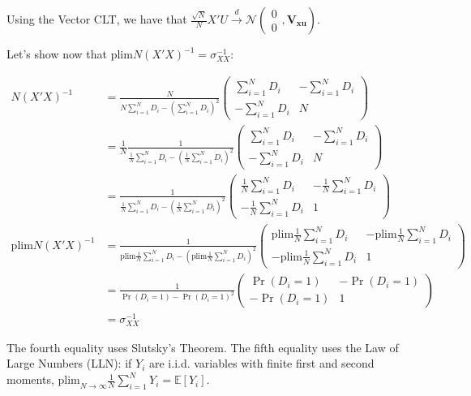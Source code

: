 \documentclass[]{book}
\newcommand{\esp}[1]{\mathbb{E}[ #1 ]}
\newcommand{\plim}[1]{\text{plim}_{ #1 \rightarrow \infty}}
\newcommand{\plims}{\text{plim}}
\theoremstyle{definition}
\theoremstyle{definition}
\theoremstyle{definition}
\theoremstyle{remark}
\begin{document}
Using the Vector CLT, we have that
\(\frac{\sqrt{N}}{N}X'U\stackrel{d}{\rightarrow}\mathcal{N}\left(\begin{array}{c} 0\\ 0\end{array},\mathbf{V_{xu}}\right)\).

Let's show now that \(\plims N(X'X)^{-1}=\sigma_{XX}^{-1}\):

\begin{align*}
N(X'X)^{-1} & = \frac{N}{N\sum_{i=1}^ND_i-\left(\sum_{i=1}^ND_i\right)^2}
                \left(\begin{array}{cc} \sum_{i=1}^ND_i & -\sum_{i=1}^ND_i \\ -\sum_{i=1}^ND_i & N \end{array}\right) \\
            & = \frac{1}{N}\frac{1}{\frac{1}{N}\sum_{i=1}^ND_i-\left(\frac{1}{N}\sum_{i=1}^ND_i\right)^2}
                \left(\begin{array}{cc} \sum_{i=1}^ND_i & -\sum_{i=1}^ND_i \\ -\sum_{i=1}^ND_i & N \end{array}\right)\\
            & = \frac{1}{\frac{1}{N}\sum_{i=1}^ND_i-\left(\frac{1}{N}\sum_{i=1}^ND_i\right)^2}
                \left(\begin{array}{cc} \frac{1}{N}\sum_{i=1}^ND_i & -\frac{1}{N}\sum_{i=1}^ND_i \\ -\frac{1}{N}\sum_{i=1}^ND_i & 1 \end{array}\right)\\
\plims N(X'X)^{-1} & = \frac{1}{\plims\frac{1}{N}\sum_{i=1}^ND_i-\left(\plims\frac{1}{N}\sum_{i=1}^ND_i\right)^2}
                \left(\begin{array}{cc} \plims\frac{1}{N}\sum_{i=1}^ND_i & -\plims\frac{1}{N}\sum_{i=1}^ND_i \\ -\plims\frac{1}{N}\sum_{i=1}^ND_i & 1 \end{array}\right)\\
                  & = \frac{1}{\Pr(D_i=1)-\Pr(D_i=1)^2}
                \left(\begin{array}{cc} \Pr(D_i=1) & -\Pr(D_i=1) \\ -\Pr(D_i=1) & 1 \end{array}\right)\\
                 & = \sigma_{XX}^{-1}
\end{align*}

The fourth equality uses Slutsky's Theorem. The fifth equality uses the
Law of Large Numbers (LLN): if \(Y_i\) are i.i.d. variables with finite
first and second moments,
\(\plim{N}\frac{1}{N}\sum_{i=1}^NY_i = \esp{Y_i}\).
\end{document}
